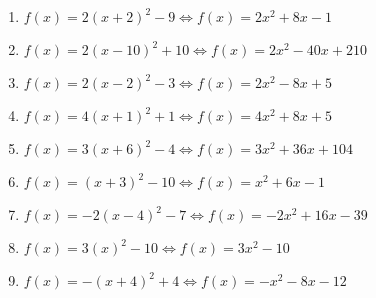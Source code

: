 \documentclass{article}%
\begin{document}
\begin{enumerate}[label=\alph*)]
\item%
\newline\vspace{0.5cm}$f(x)=2(x+2)^2 -9\Leftrightarrow f(x)=2x^2 + 8x - 1$%
\item%
\newline\vspace{0.5cm}$f(x)=2(x-10)^2 +10\Leftrightarrow f(x)=2x^2 - 40x + 210$%
\item%
\newline\vspace{0.5cm}$f(x)=2(x-2)^2 -3\Leftrightarrow f(x)=2x^2 - 8x + 5$%
\item%
\newline\vspace{0.5cm}$f(x)=4(x+1)^2 +1\Leftrightarrow f(x)=4x^2 + 8x + 5$%
\item%
\newline\vspace{0.5cm}$f(x)=3(x+6)^2 -4\Leftrightarrow f(x)=3x^2 + 36x + 104$%
\item%
\newline\vspace{0.5cm}$f(x)=(x+3)^2 -10\Leftrightarrow f(x)=x^2 + 6x - 1$%
\item%
\newline\vspace{0.5cm}$f(x)=-2(x-4)^2 -7\Leftrightarrow f(x)=-2x^2 + 16x - 39$%
\item%
\newline\vspace{0.5cm}$f(x)=3(x)^2 -10\Leftrightarrow f(x)=3x^2 - 10$%
\item%
\newline\vspace{0.5cm}$f(x)=-(x+4)^2 +4\Leftrightarrow f(x)=-x^2 - 8x - 12$%
\end{enumerate}

%
\end{document}
